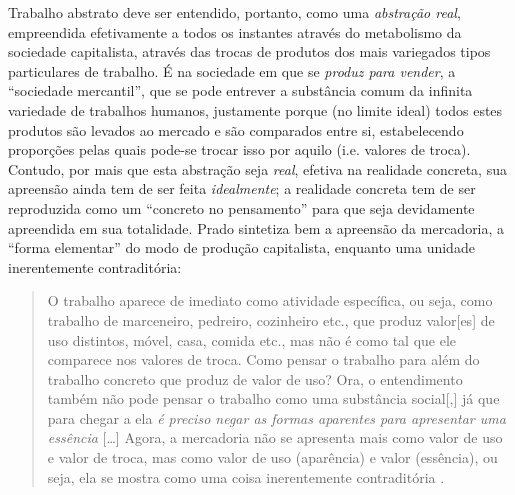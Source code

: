Trabalho abstrato deve ser entendido, portanto, como uma \emph{abstração real}, empreendida efetivamente a todos os instantes através do metabolismo da sociedade capitalista, através das trocas de produtos dos mais variegados tipos particulares de trabalho. É na sociedade em que se \emph{produz para vender}, a ``sociedade mercantil'', que se pode entrever a substância comum da infinita variedade de trabalhos humanos, justamente porque (no limite ideal) todos estes produtos são levados ao mercado e são comparados entre si, estabelecendo proporções pelas quais pode-se trocar isso por aquilo (i.e. valores de troca). Contudo, por mais que esta abstração seja \emph{real}, efetiva na realidade concreta, sua apreensão ainda tem de ser feita \emph{idealmente}; a realidade concreta tem de ser reproduzida como um ``concreto no pensamento'' para que seja devidamente apreendida em sua totalidade. Prado sintetiza bem a apreensão da mercadoria, a ``forma elementar'' do modo de produção capitalista, enquanto uma unidade inerentemente contraditória:

\begin{quote}
O trabalho aparece de imediato como atividade específica, ou seja, como trabalho de marceneiro, pedreiro, cozinheiro etc., que produz valor{[}es{]} de uso distintos, móvel, casa, comida etc., mas não é como tal que ele comparece nos valores de troca. Como pensar o trabalho para além do trabalho concreto que produz de valor de uso? Ora, o entendimento também não pode pensar o trabalho como uma substância social{[},{]} já que para chegar a ela \emph{é preciso negar as formas aparentes para apresentar uma essência} {[}\ldots{]} Agora, a mercadoria não se apresenta mais como valor de uso e valor de troca, mas como valor de uso (aparência) e valor (essência), ou seja, ela se mostra como uma coisa inerentemente contraditória \parencite[p. 4, grifo meu]{Prado2026}.
\end{quote}

